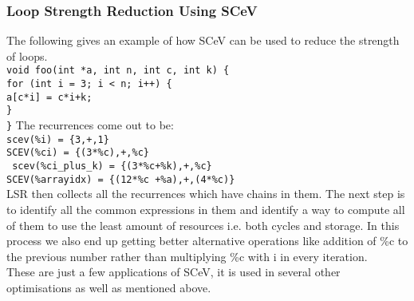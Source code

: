 \documentclass[12pt]{article}
\begin{document}
\subsubsection*{Loop Strength Reduction Using SCeV}
The following gives an example of how SCeV can be used to reduce the strength of loops.\\
\texttt{void foo(int *a, int n, int c, int k) \{\\
for (int i = 3; i < n; i++) \{\\
a[c*i] = c*i+k;\\
\}\\
\}}
The recurrences come out to be:\\
\texttt{scev(\%i) = \{3,+,1\}}\\
\texttt{SCEV(\%ci) = \{(3*\%c),+,\%c\}}\\
\texttt{ scev(\%ci\_plus\_k) = \{(3*\%c+\%k),+,\%c\}}\\
\texttt{SCEV(\%arrayidx) = \{(12*\%c +\%a),+,(4*\%c)\}}\\

LSR then collects all the recurrences which have chains in them. The next step is to identify all the common expressions in them and identify a way to compute all of them to use the least amount of resources i.e. both cycles and storage. In this process we also end up getting better alternative operations like addition of \%c to the previous number rather than multiplying \%c with i in every iteration.\\
These are just a few applications of SCeV, it is used in several other optimisations as well as mentioned above.
\end{document}
